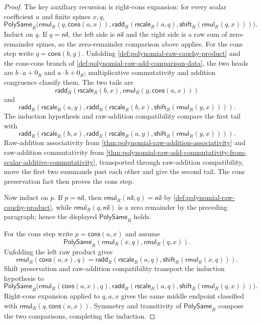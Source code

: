 \begin{proof}
The key auxiliary recursion is right-cons expansion: for every scalar coefficient $a$ and finite spines $x,q$,
$$
\mathsf{PolySame}_R\bigl(\mathsf{rmul}_R(q,\mathsf{cons}(a,x)),
\mathsf{radd}_R(\mathsf{rscale}_R(a,q),\mathsf{shift}_R(\mathsf{rmul}_R(q,x)))\bigr).
$$
Induct on $q$. If $q=\mathsf{nil}$, the left side is $\mathsf{nil}$ and the right side is a raw sum of zero-remainder spines, so the zero-remainder comparison above applies. For the cons step write $q=\mathsf{cons}(b,y)$. Unfolding \autoref{def:polynomial-raw-cauchy-product} and the cons-cons branch of \autoref{def:polynomial-raw-add-comparison-data}, the two heads are $b\cdot a+0_R$ and $a\cdot b+0_R$; multiplicative commutativity and addition congruence classify them. The two tails are
$$
\mathsf{radd}_R(\mathsf{rscale}_R(b,x),\mathsf{rmul}_R(y,\mathsf{cons}(a,x)))
$$
and
$$
\mathsf{radd}_R(\mathsf{rscale}_R(a,y),\mathsf{radd}_R(\mathsf{rscale}_R(b,x),\mathsf{shift}_R(\mathsf{rmul}_R(y,x)))).
$$
The induction hypothesis and raw-addition compatibility compare the first tail with
$$
\mathsf{radd}_R(\mathsf{rscale}_R(b,x),\mathsf{radd}_R(\mathsf{rscale}_R(a,y),\mathsf{shift}_R(\mathsf{rmul}_R(y,x)))).
$$
Raw-addition associativity from \autoref{thm:polynomial-raw-addition-associativity} and raw-addition commutativity from \autoref{thm:polynomial-raw-add-commutativity-from-scalar-additive-commutativity}, transported through raw-addition compatibility, move the first two summands past each other and give the second tail. The cons preservation fact then proves the cons step.

Now induct on $p$. If $p=\mathsf{nil}$, then $\mathsf{rmul}_R(\mathsf{nil},q)=\mathsf{nil}$ by \autoref{def:polynomial-raw-cauchy-product}, while $\mathsf{rmul}_R(q,\mathsf{nil})$ is a zero remainder by the preceding paragraph; hence the displayed $\mathsf{PolySame}_R$ holds.

For the cons step write $p=\mathsf{cons}(a,x)$ and assume
$$
\mathsf{PolySame}_R(\mathsf{rmul}_R(x,q),\mathsf{rmul}_R(q,x)).
$$
Unfolding the left raw product gives
$$
\mathsf{rmul}_R(\mathsf{cons}(a,x),q)=
\mathsf{radd}_R(\mathsf{rscale}_R(a,q),\mathsf{shift}_R(\mathsf{rmul}_R(x,q))).
$$
Shift preservation and raw-addition compatibility transport the induction hypothesis to
$$
\mathsf{PolySame}_R\bigl(\mathsf{rmul}_R(\mathsf{cons}(a,x),q),
\mathsf{radd}_R(\mathsf{rscale}_R(a,q),\mathsf{shift}_R(\mathsf{rmul}_R(q,x)))\bigr).
$$
Right-cons expansion applied to $q,a,x$ gives the same middle endpoint classified with $\mathsf{rmul}_R(q,\mathsf{cons}(a,x))$. Symmetry and transitivity of $\mathsf{PolySame}_R$ compose the two comparisons, completing the induction.
\end{proof}

